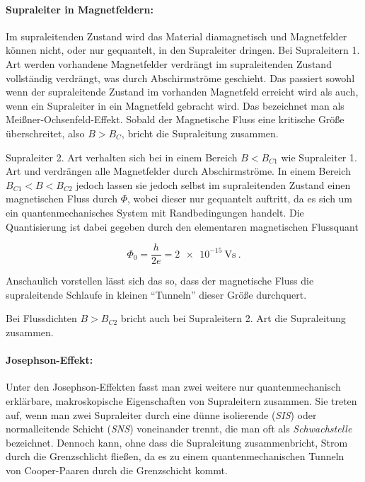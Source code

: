 \documentclass[a4paper,ngerman]{scrartcl}
\begin{document}
\paragraph{Supraleiter in Magnetfeldern:
}
Im supraleitenden Zustand wird das Material diamagnetisch und
Magnetfelder können nicht, oder nur gequantelt, in den Supraleiter
dringen. 
Bei Supraleitern 1. Art werden vorhandene Magnetfelder verdrängt im
supraleitenden Zustand vollständig verdrängt, was durch Abschirmströme
geschieht. 
Das passiert sowohl wenn der supraleitende Zustand im vorhanden
Magnetfeld erreicht wird als auch, wenn ein Supraleiter in ein
Magnetfeld gebracht wird. Das bezeichnet man als
Meißner-Ochsenfeld-Effekt.
Sobald der Magnetische Fluss eine kritische Größe überschreitet,
also $B > B_C$, bricht die Supraleitung zusammen.

Supraleiter 2. Art verhalten sich bei in einem Bereich $B < B_{C1}$
wie Supraleiter 1. Art und verdrängen alle Magnetfelder durch
Abschirmströme. 
In einem Bereich $B_{C1} < B < B_{C2}$ jedoch lassen sie jedoch selbst
im supraleitenden Zustand einen magnetischen Fluss durch $\Phi$, wobei
dieser nur gequantelt auftritt,
da es sich um ein quantenmechanisches System mit Randbedingungen
handelt. Die Quantisierung ist dabei gegeben durch den elementaren
magnetischen Flussquant

\begin{equation}
  \label{eq:phi0}
  \Phi_0 = \frac{h}{2 e} = \SI{2e-15}{\volt\second}~.
\end{equation}

Anschaulich vorstellen lässt sich das so, 
dass der magnetische Fluss die
supraleitende Schlaufe in kleinen "`Tunneln"' dieser Größe durchquert.


Bei Flussdichten $B > B_{C2}$ bricht auch bei Supraleitern 2. Art die
Supraleitung zusammen.


\paragraph{Josephson-Effekt:} Unter den Josephson-Effekten fasst man
zwei weitere nur quantenmechanisch erklärbare, makroskopische
Eigenschaften von Supraleitern zusammen. 
Sie treten auf, wenn man zwei Supraleiter durch eine dünne
isolierende (\emph{SIS}) oder normalleitende
Schicht (\emph{SNS}) voneinander trennt,
die man oft als \emph{Schwachstelle} bezeichnet. 
Dennoch kann, ohne dass die Supraleitung zusammenbricht, Strom durch die Grenzschlicht fließen, da es zu einem
quantenmechanischen Tunneln von Cooper-Paaren durch die Grenzschicht kommt.
\end{document}
